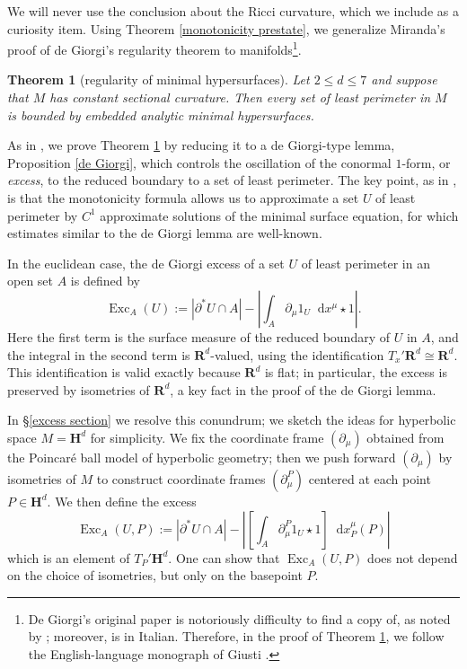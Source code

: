 \documentclass[reqno,10pt]{amsart}
\newcommand{\RR}{\mathbf{R}}
\newcommand{\Hyp}{\mathbf H}
\DeclareMathOperator{\Exc}{Exc}
\newcommand*\dif{\mathop{}\!\mathrm{d}}
\newcommand{\dfn}[1]{\emph{#1}\index{#1}}
\newtheorem{mainthm}{Theorem}
\theoremstyle{definition}
\numberwithin{equation}{section}
\begin{document}
We will never use the conclusion about the Ricci curvature, which we include as a curiosity item. 
Using Theorem \ref{monotonicity prestate}, we generalize Miranda's proof \cite{Miranda66} of de Giorgi's regularity theorem \cite{deGiorgi61} to manifolds\footnote{De Giorgi's original paper \cite{deGiorgi61} is notoriously difficulty to find a copy of, as noted by \cite{Miranda66, Giusti77}; moreover, \cite{Miranda66} is in Italian. Therefore, in the proof of Theorem \ref{main lma}, we follow the English-language monograph of Giusti \cite[Part 1]{Giusti77}.}.

\begin{mainthm}[regularity of minimal hypersurfaces]\label{main lma}
Let $2 \leq d \leq 7$ and suppose that $M$ has constant sectional curvature.
Then every set of least perimeter in $M$ is bounded by embedded analytic minimal hypersurfaces.
\end{mainthm}

As in \cite{Miranda66, Giusti77}, we prove Theorem \ref{main lma} by reducing it to a de Giorgi-type lemma, Proposition \ref{de Giorgi}, which controls the oscillation of the conormal $1$-form, or \dfn{excess}, to the reduced boundary to a set of least perimeter.
The key point, as in \cite{Miranda66, Giusti77}, is that the monotonicity formula allows us to approximate a set $U$ of least perimeter by $C^1$ approximate solutions of the minimal surface equation, for which estimates similar to the de Giorgi lemma are well-known.

In the euclidean case, the de Giorgi excess of a set $U$ of least perimeter in an open set $A$ is defined by 
$$\Exc_A(U) := |\partial^* U \cap A| - \left|\int_A \partial_\mu 1_U \dif x^\mu \star 1\right|.$$
Here the first term is the surface measure of the reduced boundary of $U$ in $A$, and the integral in the second term is $\RR^d$-valued, using the identification $T_x'\RR^d \cong \RR^d$.
This identification is valid exactly because $\RR^d$ is flat; in particular, the excess is preserved by isometries of $\RR^d$, a key fact in the proof of the de Giorgi lemma. 

In \S\ref{excess section} we resolve this conundrum; we sketch the ideas for hyperbolic space $M = \Hyp^d$ for simplicity.
We fix the coordinate frame $(\partial_\mu)$ obtained from the Poincar\'e ball model of hyperbolic geometry; then we push forward $(\partial_\mu)$ by isometries of $M$ to construct coordinate frames $(\partial_\mu^P)$ centered at each point $P \in \Hyp^d$.
We then define the excess 
\begin{equation}\label{excess definition prelim}
\Exc_A(U, P) := |\partial^* U \cap A| - \left|\left[\int_A \partial_\mu^P 1_U \star 1\right] \dif x^\mu_P(P)\right|
\end{equation}
which is an element of $T_P' \Hyp^d$.
One can show that $\Exc_A(U, P)$ does not depend on the choice of isometries, but only on the basepoint $P$.
\end{document}
